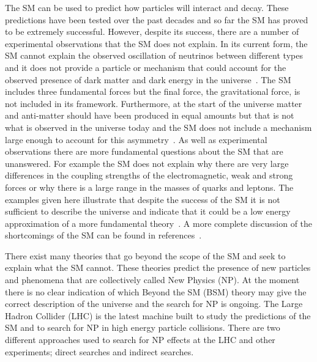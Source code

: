 The SM can be used to predict how particles will interact and decay. These predictions have been tested over the past decades and so far the SM has proved to be extremely successful. %
However, despite its success, there are a number of experimental observations that the SM does not explain. In its current form, the SM cannot explain the observed oscillation of neutrinos between different types~\cite{PhysRevLett.20.1205,Fukuda:1998fd, PhysRevLett.86.5656,PhysRevLett.87.071301} and it does not provide a particle or mechanism that could account for the observed presence of dark matter and dark energy in the universe~\cite{darkmatter1,darkmatter2,Dunkley:2008ie,Ade:2015xua}. 
The SM includes three fundamental forces but the final force, the gravitational force, is not included in its framework. 
Furthermore, at the start of the universe matter and anti-matter should have been produced in equal amounts but that is not what is observed in the universe today and the SM does not include a mechanism large enough to account for this asymmetry~\cite{Sakharov:1967dj,Gavela:1993ts}.
As well as experimental observations there are more fundamental questions about the SM that are unanswered. For example the SM does not explain why there are very large differences in the coupling strengths of the electromagnetic, weak and strong forces or why there is a large range in the masses of quarks and leptons.
The examples given here illustrate that despite the success of the SM it is not sufficient to describe the universe and indicate that it could be a low energy approximation of a more fundamental theory~\cite{lowenergySM}. A more complete discussion of the shortcomings of the SM can be found in references~\cite{Ellis:2002wba, Pomarol:2012sb}.

There exist many theories that go beyond the scope of the SM and seek to explain what the SM cannot. These theories predict the presence of new particles and phenomena that are collectively called New Physics (NP). At the moment there is no clear indication of which Beyond the SM (BSM) theory may give the correct description of the universe and the search for NP is ongoing.
The Large Hadron Collider (LHC) is the latest machine built to study the predictions of the SM and to search for NP in high energy particle collisions. There are two different approaches used to search for NP effects at the LHC and other experiments; direct searches and indirect searches.




